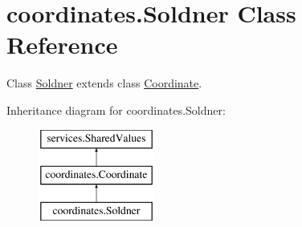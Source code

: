 \hypertarget{classcoordinates_1_1_soldner}{}\section{coordinates.\+Soldner Class Reference}
\label{classcoordinates_1_1_soldner}


Class \hyperlink{classcoordinates_1_1_soldner}{Soldner} extends class \hyperlink{classcoordinates_1_1_coordinate}{Coordinate}.  


Inheritance diagram for coordinates.\+Soldner\+:\begin{figure}[H]
\begin{center}
\leavevmode
\includegraphics[height=3.000000cm]{classcoordinates_1_1_soldner}
\end{center}
\end{figure}
